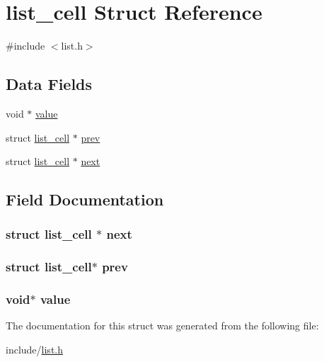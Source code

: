 \hypertarget{structlist__cell}{}\section{list\+\_\+cell Struct Reference}
\label{structlist__cell}


{\ttfamily \#include $<$list.\+h$>$}

\subsection*{Data Fields}
\begin{DoxyCompactItemize}
\item 
void $\ast$ \hyperlink{structlist__cell_a0f61d63b009d0880a89c843bd50d8d76}{value}
\item 
struct \hyperlink{structlist__cell}{list\+\_\+cell} $\ast$ \hyperlink{structlist__cell_afa8f4bac1397b0454fede2ce904df9e6}{prev}
\item 
struct \hyperlink{structlist__cell}{list\+\_\+cell} $\ast$ \hyperlink{structlist__cell_a2f971c6f993c0b5299739744a0d69594}{next}
\end{DoxyCompactItemize}


\subsection{Field Documentation}
\subsubsection[{\texorpdfstring{next}{next}}]{\setlength{\rightskip}{0pt plus 5cm}struct {\bf list\+\_\+cell} $\ast$ next}\hypertarget{structlist__cell_a2f971c6f993c0b5299739744a0d69594}{}\label{structlist__cell_a2f971c6f993c0b5299739744a0d69594}
\subsubsection[{\texorpdfstring{prev}{prev}}]{\setlength{\rightskip}{0pt plus 5cm}struct {\bf list\+\_\+cell}$\ast$ prev}\hypertarget{structlist__cell_afa8f4bac1397b0454fede2ce904df9e6}{}\label{structlist__cell_afa8f4bac1397b0454fede2ce904df9e6}
\subsubsection[{\texorpdfstring{value}{value}}]{\setlength{\rightskip}{0pt plus 5cm}void$\ast$ value}\hypertarget{structlist__cell_a0f61d63b009d0880a89c843bd50d8d76}{}\label{structlist__cell_a0f61d63b009d0880a89c843bd50d8d76}


The documentation for this struct was generated from the following file\+:\begin{DoxyCompactItemize}
\item 
include/\hyperlink{list_8h}{list.\+h}\end{DoxyCompactItemize}
